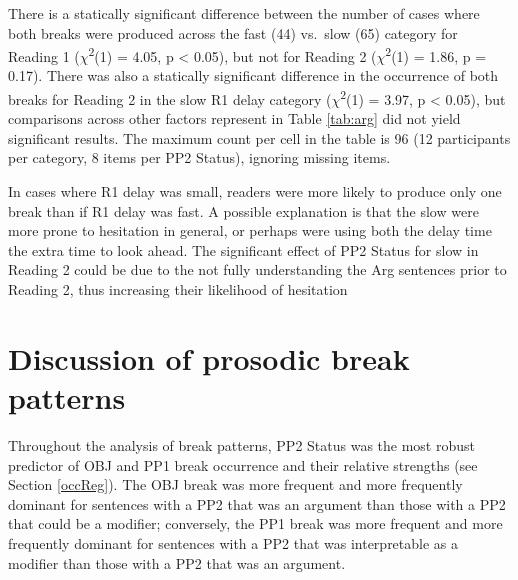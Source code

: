 \documentclass[12pt,oneside]{book}
\begin{document}

There is a statically significant difference between the number of cases where both breaks were produced across the fast (44) vs.~slow (65) category for Reading 1 (\(\chi\)\textsuperscript{2}(1) = 4.05, p \textless{} 0.05), but not for Reading 2 (\(\chi\)\textsuperscript{2}(1) = 1.86, p = 0.17). There was also a statically significant difference in the occurrence of both breaks  for Reading 2 in the slow R1 delay category (\(\chi\)\textsuperscript{2}(1) = 3.97, p \textless{} 0.05), but comparisons across other factors represent in Table \ref{tab:arg} did not yield significant results. The maximum count per cell in the table is 96 (12 participants per category, 8 items per PP2 Status), ignoring missing items.

In cases where R1 delay was small, readers were more likely to produce only one break  than if R1 delay was fast. A possible explanation is that  the slow   were more prone to hesitation in general, or perhaps were using both the delay time  the extra  time  to look ahead. The significant effect of PP2 Status for  slow  in Reading 2 could be due to the  not fully understanding the Arg sentences prior to Reading 2, thus increasing their likelihood of hesitation

\hypertarget{discussion-of-prosodic-break-patterns}{%
\section{Discussion of prosodic break patterns}\label{discussion-of-prosodic-break-patterns}}

Throughout the analysis of break patterns, PP2 Status was the most robust predictor of OBJ and PP1 break occurrence and their relative strengths (see Section \ref{occReg}). The OBJ break was more frequent and more frequently dominant for sentences with a PP2 that was an argument than those with a PP2 that could be a modifier; conversely, the PP1 break was more frequent and more frequently dominant for sentences with a PP2 that was interpretable as a modifier than those with a PP2 that was an argument.
\end{document}
